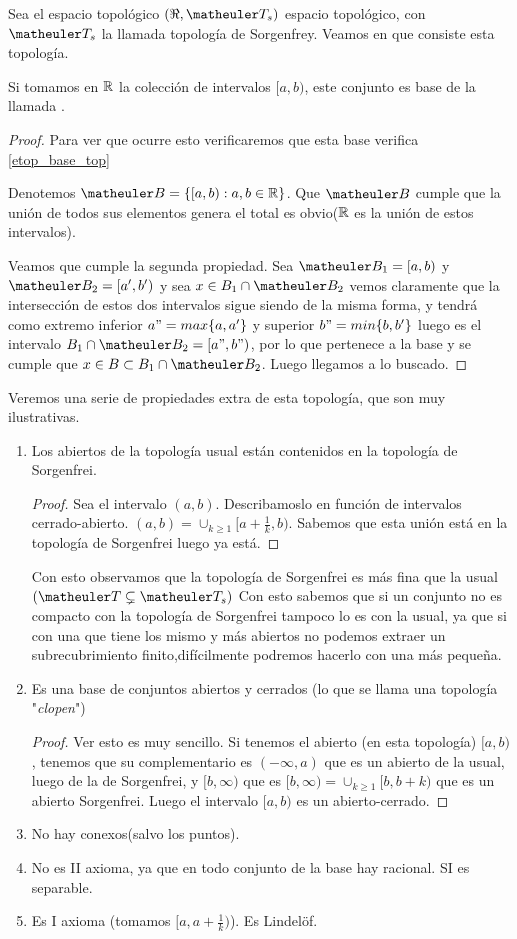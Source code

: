 \begin{exa}
	Sea el espacio topológico $(\Re, \T_s)$ espacio topológico, con $\T_s$ la llamada topología de Sorgenfrey. Veamos en que consiste esta topología. 
	
	Si tomamos en $\mathbb{R}$ la colección de intervalos $[a,b)$, este conjunto es base de la llamada .
	\begin{proof}
		Para ver que ocurre esto verificaremos que esta base verifica \ref{etop_base_top}
		
		Denotemos $\B = \{[a,b) : a,b \in \R\}$. Que $\B$ cumple que la unión de todos sus elementos genera el total es obvio($\mathbb{R}$ es la unión de estos intervalos).
		
		Veamos que cumple la segunda propiedad. Sea $\B_1=[a,b)$ y $\B_2=[a',b')$ y sea $x \in B_1 \cap \B_2$ vemos claramente que la intersección de estos dos intervalos sigue siendo de la misma forma, y tendrá como extremo inferior $a" = max\{a,a'\} $ y superior $b"=min\{b,b'\}$ luego es el intervalo $B_1 \cap \B_2 = [a",b")$, por lo que pertenece a la base y se cumple que $x \in B \subset B_1 \cap \B_2$. Luego llegamos a lo buscado.
	\end{proof}
	Veremos una serie de propiedades extra de esta topología, que son muy ilustrativas.
	\begin{enumerate}
		\item Los abiertos de la topología usual están contenidos en la topología de Sorgenfrei.
		\begin{proof}
			Sea el intervalo $(a,b)$. Describamoslo en función de intervalos cerrado-abierto. $(a,b) = \cup_{k\geq 1} [a+\frac{1}{k},b)$. Sabemos que esta unión está en la topología de Sorgenfrei luego ya está.
		\end{proof}
	Con esto observamos que la topología de Sorgenfrei es más fina que la usual $(\T \subsetneq \T_{s})$
	Con esto sabemos que si un conjunto no es compacto con la topología de Sorgenfrei tampoco lo es con la usual, ya que si con una que tiene los mismo y más abiertos no podemos extraer un subrecubrimiento finito,difícilmente podremos hacerlo con una más pequeña.
	\item Es una base de conjuntos abiertos y cerrados (lo que se llama una topología "\textit{clopen}")
	\begin{proof}
		Ver esto es muy sencillo. Si tenemos el abierto (en esta topología) $[a,b)$, tenemos que su complementario es $(-\infty, a)$ que es un abierto de la usual, luego de la de Sorgenfrei, y $[b,\infty)$ que es $[b,\infty) = \cup_{k\geq1} [b, b+k)$ que es un abierto Sorgenfrei. Luego el intervalo $[a,b)$ es un abierto-cerrado.
	\end{proof}
	\item No hay conexos(salvo los puntos).
	\item No es II axioma, ya que en todo conjunto de la base hay racional. SI es separable.
	\item Es I axioma (tomamos $[a, a+\frac{1}{k})$). Es Lindelöf.
	\end{enumerate}
\end{exa}


